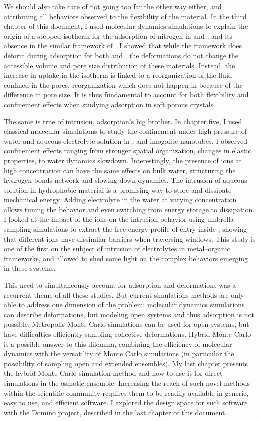 We should also take care of not going too far the other way either, and
attributing all behaviors observed to the flexibility of the material. In the third
chapter of this document, I used \abinitio molecular dynamics simulations to
explain the origin of a stepped isotherm for the adsorption of nitrogen in
 and \ZIFCl, and its absence in the similar framework of \ZIFBr. I showed
that while the framework does deform during adsorption for both  and
\ZIFCl, the deformations do not change the accessible volume and pore size
distribution of these materials. Instead, the increase in uptake in the isotherm
is linked to a reorganization of the fluid confined in the pores, reorganization
which does not happen in \ZIFBr because of the difference in pore size. It is
thus fundamental to account for both flexibility and confinement effects when
studying adsorption in soft porous crystals.

The same is true of intrusion, adsorption's big brother. In chapter five, I used
classical molecular simulations to study the confinement under high-pressure of
water and aqueous electrolyte solution in , and imogolite nanotubes. I
observed confinement effects ranging from stronger spatial organization, changes
in elastic properties, to water dynamics slowdown. Interestingly, the presence
of ions at high concentration can have the same effects on bulk water,
structuring the hydrogen bonds network and slowing down dynamics. The intrusion
of aqueous solution in hydrophobic material is a promising way to store and
dissipate mechanical energy. Adding electrolyte in the water at varying
concentration allows tuning the behavior and even switching from energy storage
to dissipation. I looked at the impact of the ions on the intrusion behavior
using umbrella sampling simulations to extract the free energy profile of entry
inside , showing that different ions have dissimilar barriers when
traversing  windows. This study is one of the first on the subject of
intrusion of electrolytes in metal--organic frameworks, and allowed to shed some
light on the complex behaviors emerging in these systems.

This need to simultaneously account for adsorption and deformations was a
recurrent theme of all these studies. But current simulations methods are only
able to address one dimension of the problem: molecular dynamics simulations can
describe deformations, but modeling open systems and thus adsorption is not
possible. Metropolis Monte Carlo simulations can be used for open systems, but
have difficulties efficiently sampling collective deformations. Hybrid Monte
Carlo is a possible answer to this dilemma, combining the efficiency of
molecular dynamics with the versatility of Monte Carlo simulations (in
particular the possibility of sampling open and extended ensembles). My last
chapter presents the hybrid Monte Carlo simulation method and how to use it for
direct simulations in the osmotic ensemble. Increasing the reach of such novel
methods within the scientific community requires them to be readily available in
generic, easy to use, and efficient software. I explored the design space for
such software with the Domino project, described in the last chapter of this
document.

